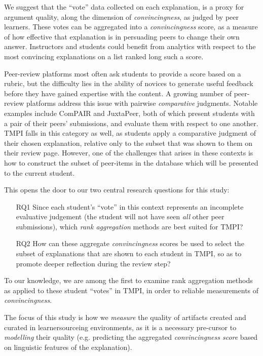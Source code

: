 \documentclass[sigconf]{acmart}
\begin{document}
We suggest that the ``vote'' data collected on each explanation, is a proxy for 
argument quality, along the dimension of \textit{convincingness}, as judged by 
peer learners. 
These votes can be aggregated into a \textit{convincingness} score, as a 
measure of how effective that explanation is in persuading peers to change 
their own answer.
Instructors and students could benefit from analytics with respect to the most 
convincing explanations on a list ranked long such a score.

Peer-review platforms most often ask students to provide a score based on a 
rubric, but the difficulty lies in the ability of novices to generate useful 
feedback before they have gained expertise with the content. 
A growing number of peer-review platforms address this issue with pairwise
\textit{comparative} judgments.
Notable examples include ComPAIR\cite{potter_compair:_2017} and 
JuxtaPeer\cite{cambre_juxtapeer:_2018}, both of which present students with a 
pair of their peers' submissions, and evaluate them with respect to one another.
TMPI falls in this category as well, as students apply a comparative judgment 
of their chosen explanation, relative only to the subset that was shown to them 
on their review page. 
However, one of the challenges that arises in these contexts is how to 
construct the subset of peer-items in the database which will be presented to 
the current student.

This opens the door to our two central research questions for this study:

\begin{itemize}
	\item[RQ1] Since each student's ``vote'' in this context represents an 
	incomplete evaluative judgement (the student will not have seen 
	\textit{all} other peer submissions), which \textit{rank aggregation} 
	methods are best suited for TMPI?

	\item[RQ2] How can these aggregate \textit{convincingness} scores be used 
	to select the subset of explanations that are shown to each student in 
	TMPI, so as to promote deeper reflection during the review step? 
\end{itemize}
	
To our knowledge, we are among the first to examine rank aggregation methods as 
applied to these student ``votes'' in TMPI, in order to reliable measurements 
of \textit{convincingness}. 

The focus of this study is how we \textit{measure} the quality of artifacts 
created and curated in learnersourceing environments, as it is a necessary 
pre-cursor to \textit{modelling} their quality (e.g. predicting the aggregated 
\textit{convincingness score} based on linguistic features of the explanation).
\end{document}
